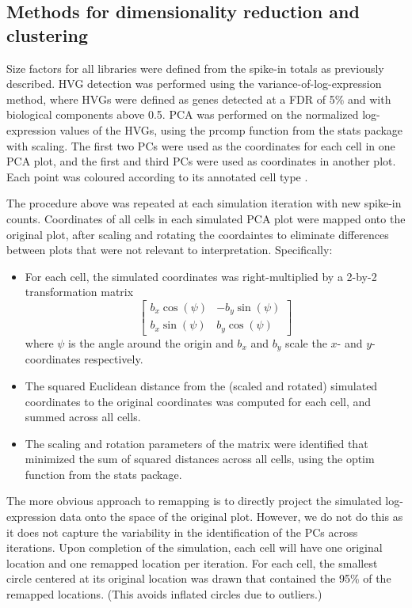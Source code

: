 \documentclass{article}
\begin{document}
\subsection{Methods for dimensionality reduction and clustering}
Size factors for all libraries were defined from the spike-in totals as previously described. 
HVG detection was performed using the variance-of-log-expression method, where HVGs were defined as genes detected at a FDR of 5\% and with biological components above 0.5.
PCA was performed on the normalized log-expression values of the HVGs, using the prcomp function from the stats package with scaling.
The first two PCs were used as the coordinates for each cell in one PCA plot, and the first and third PCs were used as coordinates in another plot.
Each point was coloured according to its annotated cell type \citep{segerstople2016single}.

The procedure above was repeated at each simulation iteration with new spike-in counts.
Coordinates of all cells in each simulated PCA plot were mapped onto the original plot, after scaling and rotating the coordaintes to eliminate differences between plots that were not relevant to interpretation.
Specifically:
\begin{itemize}
    \item For each cell, the simulated coordinates was right-multiplied by a 2-by-2 transformation matrix
        \[
            \left[\begin{array}{cc}
                    b_x \cos(\psi) & - b_y \sin(\psi) \\
                    b_x \sin(\psi) & b_y \cos(\psi) 
                \end{array}
            \right]
        \]
        where $\psi$ is the angle around the origin and $b_x$ and $b_y$ scale the $x$- and $y$-coordinates respectively.
    \item The squared Euclidean distance from the (scaled and rotated) simulated coordinates to the original coordinates was computed for each cell, and summed across all cells.
    \item The scaling and rotation parameters of the matrix were identified that minimized the sum of squared distances across all cells, using the optim function from the stats package.
\end{itemize}
The more obvious approach to remapping is to directly project the simulated log-expression data onto the space of the original plot.
However, we do not do this as it does not capture the variability in the identification of the PCs across iterations.
Upon completion of the simulation, each cell will have one original location and one remapped location per iteration. 
For each cell, the smallest circle centered at its original location was drawn that contained the 95\% of the remapped locations.
(This avoids inflated circles due to outliers.)
\end{document}
